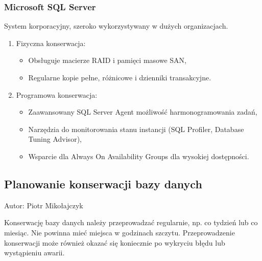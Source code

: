 \documentclass[a4paper,11pt,openany,english]{sphinxmanual}
\begin{document}
\subsubsection{Microsoft SQL Server}
\label{\detokenize{rozdzial2/Kontrola_i_konserwacja/kontrola_i_konserwacja:microsoft-sql-server}}
\sphinxAtStartPar
System korporacyjny, szeroko wykorzystywany w dużych organizacjach.
\begin{enumerate}
%
\item {} 
\sphinxAtStartPar
Fizyczna konserwacja:
\begin{itemize}
\item {} 
\sphinxAtStartPar
Obsługuje macierze RAID i pamięci masowe SAN,

\item {} 
\sphinxAtStartPar
Regularne kopie pełne, różnicowe i dzienniki transakcyjne.

\end{itemize}

\item {} 
\sphinxAtStartPar
Programowa konserwacja:
\begin{itemize}
\item {} 
\sphinxAtStartPar
Zaawansowany SQL Server Agent \textendash{} możliwość harmonogramowania zadań,

\item {} 
\sphinxAtStartPar
Narzędzia do monitorowania stanu instancji (SQL Profiler, Database Tuning Advisor),

\item {} 
\sphinxAtStartPar
Wsparcie dla Always On Availability Groups dla wysokiej dostępności.

\end{itemize}

\end{enumerate}


\subsection{Planowanie konserwacji bazy danych}
\label{\detokenize{rozdzial2/Kontrola_i_konserwacja/kontrola_i_konserwacja:planowanie-konserwacji-bazy-danych}}
\sphinxAtStartPar
Autor: Piotr Mikołajczyk

\sphinxAtStartPar
Konserwację bazy danych należy przeprowadzać regularnie, np. co tydzień lub co miesiąc. Nie powinna mieć miejsca w godzinach szczytu. Przeprowadzenie konserwacji może również okazać się koniecznie po wykryciu błędu lub wystąpieniu awarii.
\end{document}
